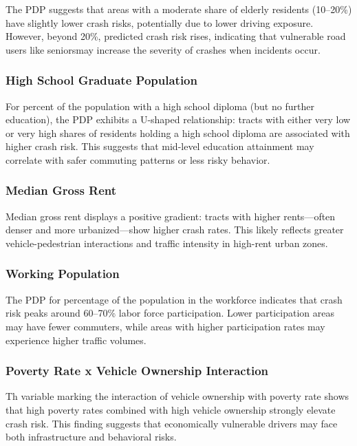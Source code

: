 \documentclass[
  number,
  review,
  3p]{elsarticle}
\begin{document}
The PDP suggests that areas with a moderate share of elderly residents
(10--20\%) have slightly lower crash risks, potentially due to lower
driving exposure. However, beyond 20\%, predicted crash risk rises,
indicating that vulnerable road users like seniorsmay increase the
severity of crashes when incidents occur.

\subsubsection{High School Graduate
Population}\label{high-school-graduate-population}

For percent of the population with a high school diploma (but no further
education), the PDP exhibits a U-shaped relationship: tracts with either
very low or very high shares of residents holding a high school diploma
are associated with higher crash risk. This suggests that mid-level
education attainment may correlate with safer commuting patterns or less
risky behavior.

\subsubsection{Median Gross Rent}\label{median-gross-rent}

Median gross rent displays a positive gradient: tracts with higher
rents---often denser and more urbanized---show higher crash rates. This
likely reflects greater vehicle-pedestrian interactions and traffic
intensity in high-rent urban zones.

\subsubsection{Working Population}\label{working-population}

The PDP for percentage of the population in the workforce indicates that
crash risk peaks around 60--70\% labor force participation. Lower
participation areas may have fewer commuters, while areas with higher
participation rates may experience higher traffic volumes.

\subsubsection{Poverty Rate x Vehicle Ownership
Interaction}\label{poverty-rate-x-vehicle-ownership-interaction}

Th variable marking the interaction of vehicle ownership with poverty
rate shows that high poverty rates combined with high vehicle ownership
strongly elevate crash risk. This finding suggests that economically
vulnerable drivers may face both infrastructure and behavioral risks.
\end{document}
